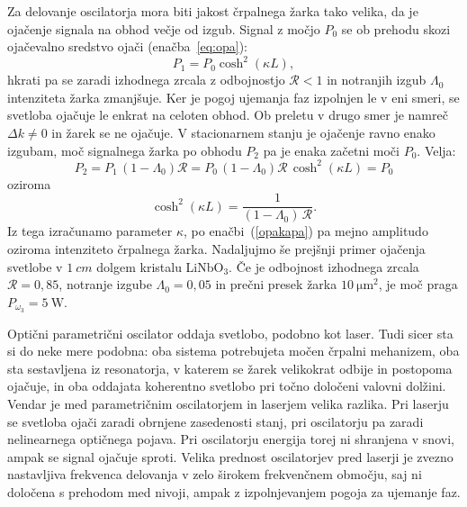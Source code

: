 Za delovanje oscilatorja mora biti jakost črpalnega žarka tako velika, da je 
ojačenje signala na obhod večje od izgub. Signal z močjo 
$P_0$ se ob prehodu skozi ojačevalno sredstvo ojači (enačba~\ref{eq:opa}):
\begin{equation}
P_1 = P_0 \cosh^2 (\kappa L),
\end{equation}
hkrati pa se zaradi izhodnega zrcala z odbojnostjo $\mathcal{R}<1$ in notranjih izgub $\Lambda_0$ 
intenziteta žarka zmanjšuje. Ker je pogoj ujemanja faz izpolnjen le v eni smeri, se svetloba
ojačuje le enkrat na celoten obhod. Ob preletu v drugo smer je namreč $\Delta k \neq 0$ in 
žarek se ne ojačuje. V stacionarnem stanju je ojačenje ravno enako izgubam, moč 
signalnega žarka po obhodu $P_2$ pa je enaka začetni moči $P_0$. Velja:
\begin{equation}
P_2 = P_1\,(1-\Lambda_0)\mathcal{R} = P_0 \,(1-\Lambda_0) \mathcal{R} \,\cosh^2 (\kappa L) = P_0
\end{equation}
oziroma
\begin{equation}
\cosh^2 (\kappa L) =\frac{1}{(1-\Lambda_0)\, \mathcal{R}}.
\end{equation}
Iz tega izračunamo parameter $\kappa$, po enačbi~(\ref{opakapa}) pa mejno 
amplitudo oziroma intenziteto črpalnega žarka. Nadaljujmo še prejšnji primer ojačenja 
svetlobe v $1~\si{cm}$ dolgem kristalu LiNbO$_{3}$.
Če je odbojnost izhodnega zrcala $\mathcal{R}=0,85$, notranje izgube $\Lambda_0 = 0,05$ in prečni presek 
žarka $10~\si{\micro\metre^2}$, je moč praga $P_{\omega_3} = 5~\si{\watt}$.
\begin{remark}
Optični parametrični oscilator oddaja svetlobo, podobno kot laser. Tudi sicer
sta si do neke mere podobna: oba sistema potrebujeta močen črpalni mehanizem, oba 
sta sestavljena iz resonatorja, v katerem se žarek velikokrat odbije in postopoma ojačuje,
in oba oddajata koherentno svetlobo pri točno določeni valovni dolžini. Vendar
je med parametričnim oscilatorjem in laserjem velika razlika. Pri laserju se svetloba
ojači zaradi obrnjene zasedenosti stanj, pri oscilatorju pa 
zaradi nelinearnega optičnega pojava. Pri oscilatorju energija torej ni shranjena v
snovi, ampak se signal ojačuje sproti. Velika prednost oscilatorjev pred laserji 
je zvezno nastavljiva frekvenca delovanja v zelo širokem frekvenčnem območju, saj ni določena
s prehodom med nivoji, ampak z izpolnjevanjem pogoja za ujemanje faz.
\end{remark}

